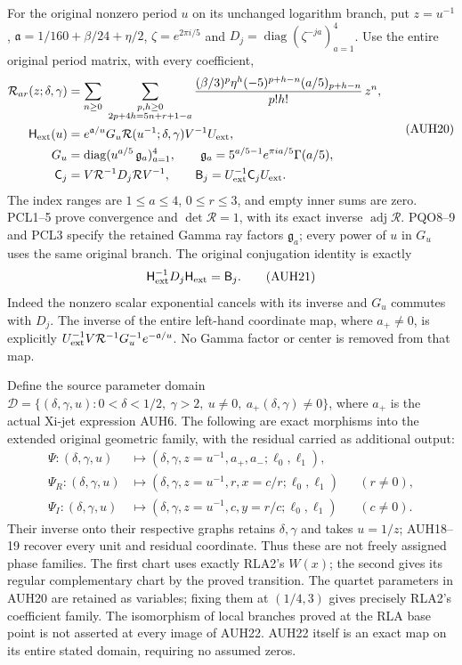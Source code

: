 For the original nonzero period $u$ on its unchanged logarithm branch,
put $z=u^{-1}$, $\mathfrak a=1/160+\beta/24+\eta/2$,
$\zeta=e^{2\pi i/5}$ and
$D_j=\operatorname{diag}(\zeta^{-ja})_{a=1}^4$.
Use the entire original period matrix, with every coefficient,
\[
\begin{aligned}
 \mathcal R_{ar}(z;\delta,\gamma)
 &=\sum_{n\ge0}\ 
 \sum_{\substack{p,h\ge0\\2p+4h=5n+r+1-a}}
 \frac{(\beta/3)^p\eta^h(-5)^{p+h-n}(a/5)_{p+h-n}}{p!h!}\,z^n,\\
 \mathsf H_{\rm ext}(u)&=
 e^{\mathfrak a/u}G_u\mathcal R(u^{-1};\delta,\gamma)V^{-1}U_{\rm ext},\\
 G_u&=\operatorname{diag}(u^{a/5}\,\mathfrak g_a)_{a=1}^4,\qquad
 \mathfrak g_a=5^{a/5-1}e^{\pi ia/5}\Gamma(a/5),\\
 \mathsf C_j&=V\mathcal R^{-1}D_j\mathcal RV^{-1},\qquad
 \mathsf B_j=U_{\rm ext}^{-1}\mathsf C_jU_{\rm ext}.
\end{aligned}\tag{AUH20}
\]
The index ranges are $1\le a\le4$, $0\le r\le3$, and empty
inner sums are zero.  PCL1--5 prove convergence and
$\det\mathcal R=1$, with its exact inverse $\operatorname{adj}\mathcal R$.
PQO8--9 and PCL3 specify the retained Gamma ray factors $\mathfrak g_a$;
every power of $u$ in $G_u$ uses the same original branch.
The original conjugation identity is exactly
\[
 \mathsf H_{\rm ext}^{-1}D_j\mathsf H_{\rm ext}=\mathsf B_j.
 \tag{AUH21}
\]
Indeed the nonzero scalar exponential cancels with its inverse and
$G_u$ commutes with $D_j$.  The inverse of the entire left-hand
coordinate map, where $a_+\ne0$, is explicitly
$U_{\rm ext}^{-1}V\mathcal R^{-1}G_u^{-1}e^{-\mathfrak a/u}$.
No Gamma factor or center is removed from that map.

Define the source parameter domain
$\mathcal D=\{(\delta,\gamma,u):0<\delta<1/2,\ \gamma>2,
\ u\ne0,\ a_+(\delta,\gamma)\ne0\}$,
where $a_+$ is the actual Xi-jet expression AUH6.
The following are exact morphisms into the extended original
geometric family, with the residual carried as additional output:
\[
\begin{aligned}
 \Psi:(\delta,\gamma,u)&\longmapsto
  (\delta,\gamma,z=u^{-1},a_+,a_-;\ell_0,\ell_1),\\
 \Psi_R:(\delta,\gamma,u)&\longmapsto
  (\delta,\gamma,z=u^{-1},r,x=c/r;\ell_0,\ell_1)
                                      &&(r\ne0),\\
 \Psi_I:(\delta,\gamma,u)&\longmapsto
  (\delta,\gamma,z=u^{-1},c,y=r/c;\ell_0,\ell_1)
                                      &&(c\ne0).
\end{aligned}\tag{AUH22}
\]
Their inverse onto their respective graphs retains $\delta,\gamma$
and takes $u=1/z$; AUH18--19 recover every unit and residual
coordinate.  Thus these are not freely assigned phase families.
The first chart uses exactly RLA2's $W(x)$; the second gives its
regular complementary chart by the proved transition.
The quartet parameters in AUH20 are retained as variables; fixing
them at $(1/4,3)$ gives precisely RLA2's coefficient family.
The isomorphism of local branches proved at the RLA base point is
not asserted at every image of AUH22.  AUH22 itself is an exact
map on its entire stated domain, requiring no assumed zeros.

